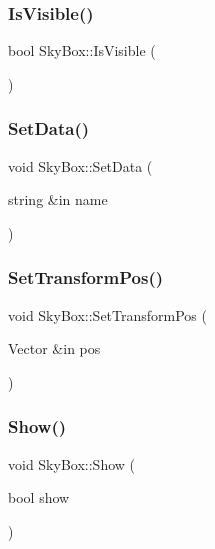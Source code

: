 \hypertarget{class_sky_box_a1fc096488dc4353a798d321efc81933a}{}\label{class_sky_box_a1fc096488dc4353a798d321efc81933a} 
\subsubsection{\texorpdfstring{Is\+Visible()}{IsVisible()}}
{\footnotesize\ttfamily bool Sky\+Box\+::\+Is\+Visible (\begin{DoxyParamCaption}{ }\end{DoxyParamCaption})}

\hypertarget{class_sky_box_abc8f19d5e30b400659a82c49b83065eb}{}\label{class_sky_box_abc8f19d5e30b400659a82c49b83065eb} 
\subsubsection{\texorpdfstring{Set\+Data()}{SetData()}}
{\footnotesize\ttfamily void Sky\+Box\+::\+Set\+Data (\begin{DoxyParamCaption}\item[{string \&in}]{name }\end{DoxyParamCaption})}

\hypertarget{class_sky_box_a4227939fe4cf35eb866fad263c93ee60}{}\label{class_sky_box_a4227939fe4cf35eb866fad263c93ee60} 
\subsubsection{\texorpdfstring{Set\+Transform\+Pos()}{SetTransformPos()}}
{\footnotesize\ttfamily void Sky\+Box\+::\+Set\+Transform\+Pos (\begin{DoxyParamCaption}\item[{Vector \&in}]{pos }\end{DoxyParamCaption})}

\hypertarget{class_sky_box_a0e1ed28fb770fe328f5eb65078979c4e}{}\label{class_sky_box_a0e1ed28fb770fe328f5eb65078979c4e} 
\subsubsection{\texorpdfstring{Show()}{Show()}}
{\footnotesize\ttfamily void Sky\+Box\+::\+Show (\begin{DoxyParamCaption}\item[{bool}]{show }\end{DoxyParamCaption})}

